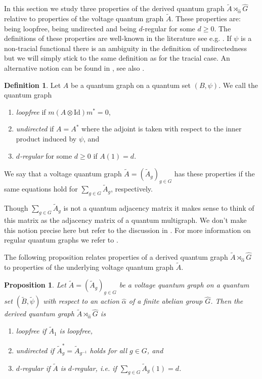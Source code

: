 \documentclass{amsart}
\newtheorem{proposition}[thm]{Proposition}
\theoremstyle{definition}
\newtheorem{definition}[thm]{Definition}
\theoremstyle{definition}
\begin{document}
In this section we study three properties of the derived quantum graph $\tilde{A} \rtimes_{\hat{\alpha}} \hat{G}$ relative to properties of the voltage quantum graph $\tilde{A}$. These properties are: being loopfree, being undirected and being $d$-regular for some $d \geq 0$. The definitions of these properties are well-known in the literature see e.g. \cite{musto_compositional_2018,matsuda_classification_2022}. If $\psi$ is a non-tracial functional there is an ambiguity in the definition of undirectedness but we will simply stick to the same definition as for the tracial case. An alternative notion can be found in \cite{wasilewski_quantum_2024}, see also \cite{daws_quantum_2024}.

\begin{definition}
    Let $A$ be a quantum graph on a quantum set $(B, \psi)$. We call the quantum graph
    \begin{enumerate}
        \item \emph{loopfree} if $m(A \otimes \mathrm{Id})m^\ast = 0$,
        \item \emph{undirected} if $A = A^\ast$ where the adjoint is taken with respect to the inner product induced by $\psi$, and
        \item \emph{$d$-regular} for some $d \geq 0$ if $A(1) = d$.
    \end{enumerate}
    We say that a voltage quantum graph $\tilde{A} = (\tilde{A}_g)_{g \in G}$ has these properties if the same equations hold for $\sum_{g \in G} \tilde{A}_g$, respectively.
\end{definition}

Though $\sum_{g \in G} \tilde{A}_g$ is not a quantum adjacency matrix it makes sense to think of this matrix as the adjacency matrix of a quantum multigraph. We don't make this notion precise here but refer to the discussion in \cite[Section 2]{gromada_examples_2022}. For more information on regular quantum graphs we refer to \cite{matsuda_algebraic_2024}.

The following proposition relates properties of a derived quantum graph $\tilde{A} \rtimes_{\hat{\alpha}} \hat{G}$ to properties of the underlying voltage quantum graph $\tilde{A}$. 

\begin{proposition}\label{prop:voltage_to_derived_properties}
    Let $\tilde{A} = (\tilde{A}_g)_{g \in G}$ be a voltage quantum graph on a quantum set $(\tilde{B}, \tilde{\psi})$ with respect to an action $\hat{\alpha}$ of a finite abelian group $\hat{G}$. Then the derived quantum graph $\tilde{A} \rtimes_{\hat{\alpha}} \hat{G}$ is
    \begin{enumerate}
        \item loopfree if $\tilde{A}_1$ is loopfree,
        \item undirected if $\tilde{A}_g^\ast = \tilde{A}_{g^{-1}}$ holds for all $g \in G$, and
        \item $d$-regular if $\tilde{A}$ is $d$-regular, i.e. if $\sum_{g \in G} \tilde{A}_g(1) = d$.
    \end{enumerate}
\end{proposition}
\end{document}

